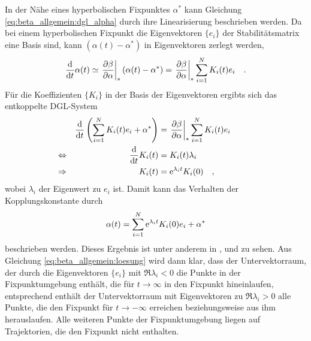     In der Nähe eines hyperbolischen Fixpunktes $\alpha^*$ kann Gleichung 
    \eqref{eq:beta_allgemein:dgl_alpha} durch ihre Linearisierung
     beschrieben werden. Da bei einem hyperbolischen Fixpunkt die 
     Eigenvektoren $\{e_i\}$ der Stabilitätsmatrix eine Basis sind, kann 
     $(\alpha(t)-\alpha^*)$ in Eigenvektoren zerlegt werden, 
     \begin{equation}
     \frac{\text{d}}{\text{d} t} \alpha(t) \simeq \left.\frac{\partial \beta}{\partial \alpha}\right|_* \left(\alpha(t)-\alpha^*\right) 
     = \left.\frac{\partial \beta}{\partial \alpha}\right|_* \sum_{i=1}^N K_i(t) e_i  \quad . 
     \label{eq:beta_allgemein:beta_linear}
     \end{equation}
     Für die Koeffizienten $\{K_i\}$ in der Basis der Eigenvektoren ergibts 
     sich das entkoppelte DGL-System
    \begin{align}
     &&\frac{\text{d}}{\text{d} t} \left(\sum\limits_{i=1}^N K_i(t)e_i + \alpha^* \right) &=
     \left.\frac{\partial \beta}{\partial \alpha}\right|_* \sum\limits_{i=1}^N K_i(t) e_i 		&&&&&& \\
     &\Leftrightarrow &  \frac{\text{d}}{\text{d} t} K_i(t) &= K_i(t) \lambda_i  
     \label{eq:beta_allgemein:K} 			\\
     &\Rightarrow &
     K_i(t)&=\text{e}^{\lambda_i t} K_i(0)      	
     \label{eq:beta_allgemein:K_loesung} 	\quad ,
    \end{align}
    wobei $\lambda_i$ der Eigenwert zu $e_i$ ist. Damit kann das Verhalten der 
    Kopplungskonstante durch
    \begin{equation}
     \alpha(t)=\sum\limits_{i=1}^N \text{e}^{\lambda_i t} K_i(0) e_i +\alpha^* 
     \label{eq:beta_allgemein:loesung}
    \end{equation}
    beschrieben werden.
    Dieses Ergebnis ist unter anderem in \cite{Weinberg:1976}, 
    \cite{GR_Weinberg} und \cite{Asymptotic_safety_guaranteed} zu sehen.
    Aus Gleichung \eqref{eq:beta_allgemein:loesung} wird dann klar, dass 
    der Untervektorraum, der durch die Eigenvektoren $\{e_i\}$ mit 
    $\Re\lambda_i < 0$ die Punkte in der Fixpunktumgebung enthält, die für 
    $t \to \infty$ in den Fixpunkt hineinlaufen, entsprechend enthält der 
    Untervektorraum mit Eigenvektoren zu $\Re\lambda_i > 0$ alle Punkte, die 
    den Fixpunkt für $t\to -\infty$ erreichen beziehungsweise aus ihm 
    herauslaufen. Alle weiteren Punkte der Fixpunktumgebung liegen auf 
    Trajektorien, die den Fixpunkt nicht enthalten.
    
